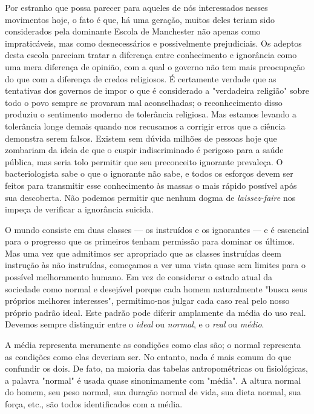 \documentclass[12pt]{article}
\begin{document}
Por estranho que possa parecer para aqueles de nós interessados nesses movimentos hoje, o fato é que, há uma geração, muitos deles teriam sido considerados pela dominante Escola de Manchester não apenas como impraticáveis, mas como desnecessários e possivelmente prejudiciais. Os adeptos desta escola pareciam tratar a diferença entre conhecimento e ignorância como uma mera diferença de opinião, com a qual o governo não tem mais preocupação do que com a diferença de credos religiosos. É certamente verdade que as tentativas dos governos de impor o que é considerado a "verdadeira religião" sobre todo o povo sempre se provaram mal aconselhadas; o reconhecimento disso produziu o sentimento moderno de tolerância religiosa. Mas estamos levando a tolerância longe demais quando nos recusamos a corrigir erros que a ciência demonstra serem falsos. Existem sem dúvida milhões de pessoas hoje que zombariam da ideia de que o cuspir indiscriminado é perigoso para a saúde pública, mas seria tolo permitir que seu preconceito ignorante prevaleça. O bacteriologista sabe o que o ignorante não sabe, e todos os esforços devem ser feitos para transmitir esse conhecimento às massas o mais rápido possível após sua descoberta. Não podemos permitir que nenhum dogma de \textit{laissez-faire} nos impeça de verificar a ignorância suicida.

O mundo consiste em duas classes — os instruídos e os ignorantes — e é essencial para o progresso que os primeiros tenham permissão para dominar os últimos. Mas uma vez que admitimos ser apropriado que as classes instruídas deem instrução às não instruídas, começamos a ver uma vista quase sem limites para o possível melhoramento humano. Em vez de considerar o estado atual da sociedade como normal e desejável porque cada homem naturalmente "busca seus próprios melhores interesses", permitimo-nos julgar cada caso real pelo nosso próprio padrão ideal. Este padrão pode diferir amplamente da média do uso real. Devemos sempre distinguir entre o \textit{ideal} ou \textit{normal}, e o \textit{real} ou \textit{médio}.

A média representa meramente as condições como elas são; o normal representa as condições como elas deveriam ser. No entanto, nada é mais comum do que confundir os dois. De fato, na maioria das tabelas antropométricas ou fisiológicas, a palavra "normal" é usada quase sinonimamente com "média". A altura normal do homem, seu peso normal, sua duração normal de vida, sua dieta normal, sua força, etc., são todos identificados com a média.
\end{document}

